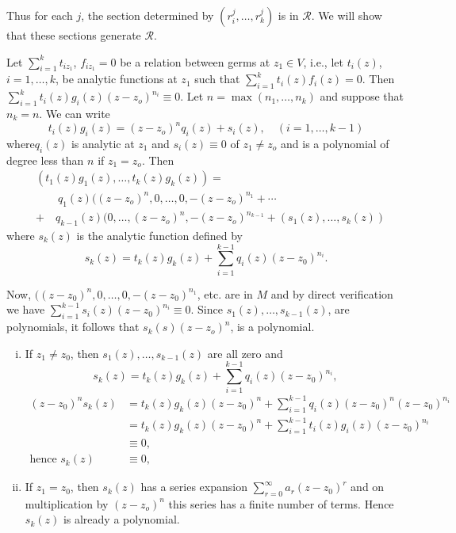  Thus for each $j$, the section determined by $(r^j_i , \ldots ,
 r^j_k)$ is in $\mathscr{R}$. We will show that these sections
 generate $\mathscr{R}$. 
 
 Let $\sum^k_{i=1} t_{i z_1}$, $f_{i z_1} = 0$ be a relation between
 germs at $z_1 \in V$, i.e., let $t_i (z)$, $i = 1, \ldots, k$, be
 analytic functions at $z_1$ such that $\sum^k_{i=1} t_i(z) f_i (z) =
 0$. Then $\sum^k_{i=1} t_i(z) g_i(z) (z-z_o)^{n_i} \equiv  0$. Let $n =
 \max(n_1, \ldots , n_k)$ and suppose that $n_k = n$. We can write 
  $$
 t_i(z) g_i(z) = (z - z_o)^n q_i (z) + s_i(z), \quad (i =1, \ldots , k-1) 
 $$
 where\pageoriginale $q_i(z)$ is analytic at $z_1$ and $s_i(z) \equiv
 0$ of $z_1 \neq z_o$ and is a polynomial of degree less than $n$ if
 $z_1 =  z_o$. Then 
\begin{align*}
& (t_1(z)g_1(z), \ldots, t_k(z) g_k (z))=\\
& \qquad q_1(z)((z-z_o)^n, 0, \ldots,0,- (z-z_o)^{n_1}+ \cdots \\
& + \quad   q_{k-1}(z)(0, \ldots, 
 (z-z_o)^n,- (z-z_o)^{n_{k-1}}+ (s_1 (z), \ldots, s_k(z))
\end{align*}
where $s_k(z)$ is the analytic function defined by  
$$
s_k(z) =t_k(z) g_k(z) + \sum^{k-1}_{i=1} q_i (z)(z-z_0)^{n_i}. 
$$

Now, $((z-z_0)^n, 0, \ldots, 0, -(z-z_0)^{n_1}$, etc. are in $M$ and by
direct verification we have $\sum^{k-1}_{i=1} s_i (z) (z-z_0)^{n_i}
\equiv 0$. Since $s_1(z), \ldots , s_{k-1}(z)$, are polynomials, it
follows that $s_k(s) (z-z_o)^n$, is a polynomial. 
\begin{enumerate}[(i)]
\item If $z_1 \neq z_0$, then $s_1(z), \ldots, s_{k-1}(z)$ are all
  zero and  
$$
s_k(z)= t_k(z) g_k(z) + \sum^{k-1}_{i=1}q_i(z) (z-z_0)^{n_i},  
$$
\begin{align*}
(z-z_0)^n s_k(z) & = t_k(z) g_k(z) (z-z_0)^n +
  \sum^{k-1}_{i=1}q_i(z) (z-z_0)^{n} (z-z_0)^{n_i}\\ 
&= t_k(z) g_k(z) (z-z_0)^n + \sum^{k-1}_{i=1}t_i(z) g_i(z)
  (z-z_0)^{n_i}\\ 
& \equiv 0,\\
\text{hence }  s_k(z) & \equiv 0,
\end{align*}
\item If $z_1 =z_0$, then $s_k(z)$ has a series expansion
  $\sum^{\infty}_{r=0} a_r(z-z_0)^r$ and on multiplication by
  $(z-z_o)^n$ this series has a finite number of terms. Hence $s_k(z)$
  is already a polynomial. 
\end{enumerate}

